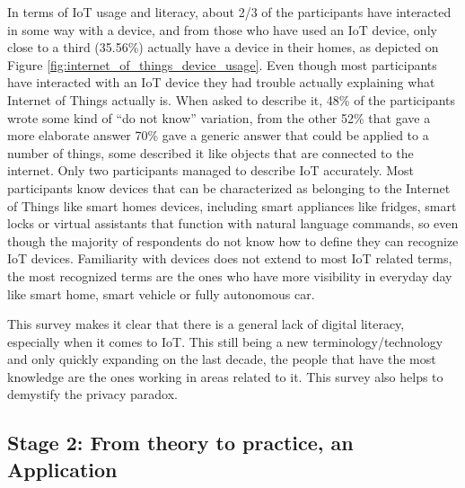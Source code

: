 In terms of IoT usage and literacy, about 2/3 of the participants have interacted in
some way with a device, and from those who have used an IoT device, only close
to a third (35.56\%) actually have a device in their homes, as depicted on
Figure \ref{fig:internet_of_things_device_usage}. Even though most participants
have interacted with an IoT device they had trouble actually explaining what Internet
of Things actually is. When asked to describe it, 48\% of the participants
wrote some kind of ``do not know'' variation, from the other 52\% that gave
a more elaborate answer 70\% gave a generic answer that could be applied to
a number of things, some described it like objects that are connected
to the internet. Only two participants managed to describe IoT accurately.
Most participants know devices that can be characterized as belonging to
the Internet of Things like smart homes devices, including smart
appliances like fridges, smart locks or virtual assistants that
function with natural language commands, so even though the majority
of respondents do not know how to define they can recognize IoT devices.
Familiarity with devices does not extend to most IoT related terms,
the most recognized terms are the ones who have more visibility
in everyday day like smart home, smart vehicle or fully autonomous car.

This survey makes it clear that there is a general lack of digital
literacy, especially when it comes to IoT. This still being
a new terminology/technology and only quickly expanding on the last decade,
the people that have the most knowledge are the ones working
in areas related to it. This survey also helps to demystify the
privacy paradox.

\subsection{Stage 2: From theory to practice, an Application}
\label{subsection:stage2}

